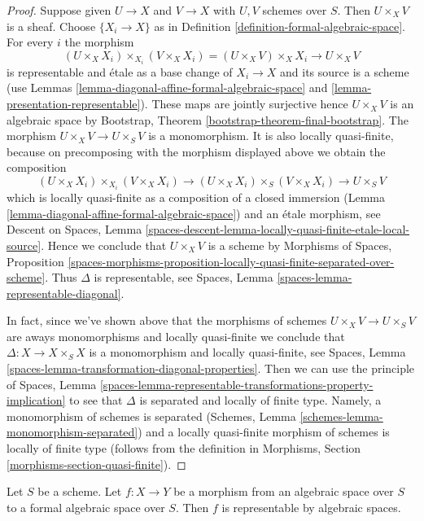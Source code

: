 \begin{proof}
Suppose given $U \to X$ and $V \to X$ with $U, V$ schemes over $S$.
Then $U \times_X V$ is a sheaf. Choose $\{X_i \to X\}$ as in
Definition \ref{definition-formal-algebraic-space}.
For every $i$ the morphism
$$
(U \times_X X_i) \times_{X_i} (V \times_X X_i)
= (U \times_X V) \times_X X_i \to U \times_X V
$$
is representable and \'etale as a base change of $X_i \to X$
and its source is a scheme (use
Lemmas \ref{lemma-diagonal-affine-formal-algebraic-space} and
\ref{lemma-presentation-representable}). These maps are jointly surjective
hence $U \times_X V$ is an algebraic space by
Bootstrap, Theorem \ref{bootstrap-theorem-final-bootstrap}.
The morphism $U \times_X V \to U \times_S V$ is a monomorphism.
It is also locally quasi-finite, because on precomposing with
the morphism displayed above we obtain the composition
$$
(U \times_X X_i) \times_{X_i} (V \times_X X_i)
\to (U \times_X X_i) \times_S (V \times_X X_i)
\to U \times_S V
$$
which is locally quasi-finite as a composition of a closed
immersion (Lemma \ref{lemma-diagonal-affine-formal-algebraic-space})
and an \'etale morphism, see
Descent on Spaces, Lemma
\ref{spaces-descent-lemma-locally-quasi-finite-etale-local-source}.
Hence we conclude that $U \times_X V$ is a scheme by
Morphisms of Spaces, Proposition
\ref{spaces-morphisms-proposition-locally-quasi-finite-separated-over-scheme}.
Thus $\Delta$ is representable, see
Spaces, Lemma \ref{spaces-lemma-representable-diagonal}.

\medskip\noindent
In fact, since we've shown above that the morphisms of schemes
$U \times_X V \to U \times_S V$ are aways monomorphisms and
locally quasi-finite we conclude that $\Delta : X \to X \times_S X$
is a monomorphism and locally quasi-finite, see
Spaces, Lemma \ref{spaces-lemma-transformation-diagonal-properties}.
Then we can use the principle of
Spaces, Lemma
\ref{spaces-lemma-representable-transformations-property-implication}
to see that $\Delta$ is separated and locally of finite type.
Namely, a monomorphism of schemes is separated
(Schemes, Lemma \ref{schemes-lemma-monomorphism-separated})
and a locally quasi-finite morphism of schemes is
locally of finite type
(follows from the definition in
Morphisms, Section \ref{morphisms-section-quasi-finite}).
\end{proof}

\begin{lemma}
\label{lemma-space-to-formal-space}
Let $S$ be a scheme. Let $f : X \to Y$ be a morphism from an
algebraic space over $S$ to a formal algebraic space over $S$.
Then $f$ is representable by algebraic spaces.
\end{lemma}

